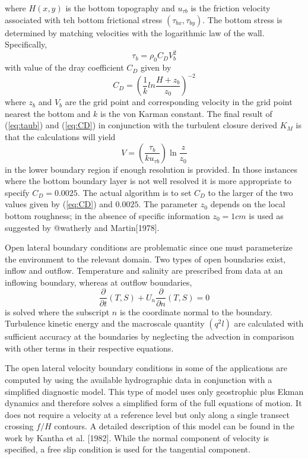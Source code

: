 \documentclass[oribibl]{llncs}
\begin{document}
where $H(x,y)$ is the bottom topography and $u_{\tau b}$ is the friction velocity associated with teh bottom frictional stress $(\tau_{bx}, \tau_{by})$. The bottom stress is determined by matching velocities with the logarithmic law of the wall. Specifically,
\begin{equation} 
\tau_b=\rho_0 C_D V_b^2 \label{eq:taub}
\end{equation}
with value of the dray coefficient $C_D$ given by
\begin{equation}
C_D= \left( \frac{1}{k} ln \frac{H+z_b}{z_0} \right)^{-2} \label{eq:CD}
\end{equation}
where $z_b$ and $V_b$ are the grid point and corresponding velocity in the grid point nearest the bottom and $k$ is the von Karman constant. The final result of (\ref{eq:taub}) and (\ref{eq:CD}) in conjunction with the turbulent closure derived $K_M$ is that the calculations will yield
\begin{equation}
V= \left( \frac{\tau_b}{k u_{\tau b}} \right)  \ln \frac{z}{z_0} \label{eq:v}
\end{equation}
 in the lower boundary region if enough resolution is provided. In those instances where the bottom boundary layer is not well resolved it is more appropriate to specify $C_D=0.0025$. The actual algorithm is to set $C_D$ to the larger of the two values given by (\ref{eq:CD}) and $0.0025$. The parameter $z_0$ depends on the local bottom roughness; in the absence of specific information $z_0=1 cm$ is used as suggested by @watherly and Martin[1978].
 
Open lateral boundary conditions are problematic since one must parameterize the environment to the relevant domain. Two types of open boundaries exist, inflow and outflow. Temperature and salinity are prescribed from data at an inflowing boundary, whereas at outflow boundaries,
 \begin{equation}
 \frac{\partial}{\partial t}(T, S) + U_n \frac{\partial}{\partial n} (T, S) =0
 \end{equation}
 is solved where the subscript $n$ is the coordinate normal to the boundary. Turbulence kinetic energy and the macroscale quantity $(q^2l)$ are calculated with sufficient accuracy at the boundaries by neglecting the advection in comparison with other terms in their respective equations.
 
 The open lateral velocity boundary conditions in some of the applications  are computed by using the available hydrographic data in conjunction with a simplified diagnostic model. This type of model uses only geostrophic plus Ekman dynamics and therefore solves a simplified form of the full equations of motion. It does not require a velocity at a reference level but only along a single transect crossing $f/H$ contours. A detailed description of this model can be found in the work by Kantha et al. [1982]. While the normal component of velocity is specified, a free slip condition is used for the tangential component.
 
\end{document}
